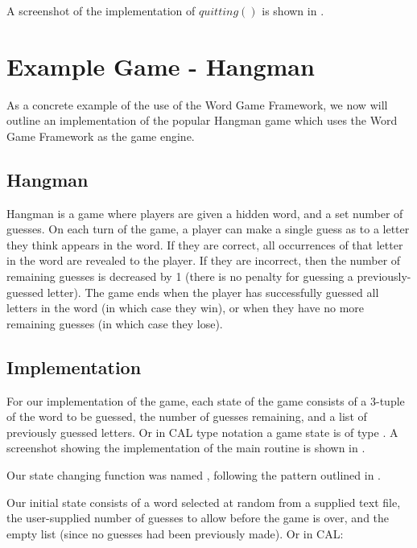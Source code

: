 A screenshot of the implementation of \(quitting()\) is shown in .


\section{Example Game - Hangman}
\label{hangmanImplDetails}

As a concrete example of the use of the Word Game Framework, we now will outline an implementation of the popular Hangman game which uses the Word Game Framework as the game engine.

\subsection{Hangman}

Hangman is a game where players are given a hidden word, and a set number of guesses.  On each turn of the game, a player can make a single guess as to a letter they think appears in the word.  If they are correct, all occurrences of that letter in the word are revealed to the player.  If they are incorrect, then the number of remaining guesses is decreased by 1 (there is no penalty for guessing a previously-guessed letter).  The game ends when the player has successfully guessed all letters in the word (in which case they win), or when they have no more remaining guesses (in which case they lose).

\subsection{Implementation}

For our implementation of the game, each state of the game consists of a 3-tuple of the word to be guessed, the number of guesses remaining, and a list of previously guessed letters.  Or in CAL type notation a game state is of type .  A screenshot showing the implementation of the main  routine is shown in .


Our state changing function was named , following the pattern outlined in \cite{Curtis05}.

Our initial state consists of a word selected at random from a supplied text file, the user-supplied number of guesses to allow before the game is over, and the empty list (since no guesses had been previously made).  Or in CAL: 

